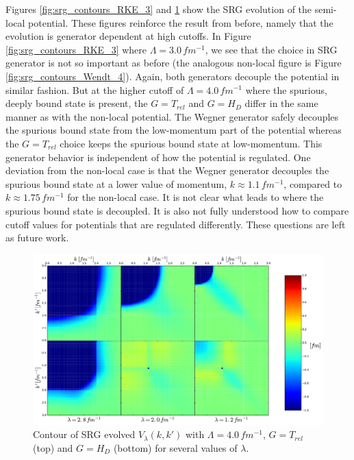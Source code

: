 \documentclass[preprintnumbers,floatfix,aps,prc,preprint]{revtex4-1}
\begin{document}
%
Figures \ref{fig:srg_contours_RKE_3} and \ref{fig:srg_contours_RKE_4} show the SRG evolution of the semi-local potential. These figures reinforce the result from before, namely that the evolution is generator dependent at high cutoffs. In Figure \ref{fig:srg_contours_RKE_3} where $\Lambda=3.0 \, fm^{-1}$, we see that the choice in SRG generator is not so important as before (the analogous non-local figure is Figure \ref{fig:srg_contours_Wendt_4}). Again, both generators decouple the potential in similar fashion. But at the higher cutoff of $\Lambda=4.0 \, fm^{-1}$ where the spurious, deeply bound state is present, the $G=T_{rel}$ and $G=H_D$ differ in the same manner as with the non-local potential. The Wegner generator safely decouples the spurious bound state from the low-momentum part of the potential whereas the $G=T_{rel}$ choice keeps the spurious bound state at low-momentum. This generator behavior is independent of how the potential is regulated. One deviation from the non-local case is that the Wegner generator decouples the spurious bound state at a lower value of momentum, $k \approx 1.1 \, fm^{-1}$, compared to $k \approx 1.75 \, fm^{-1}$ for the non-local case. It is not clear what leads to where the spurious bound state is decoupled. It is also not fully understood how to compare cutoff values for potentials that are regulated differently. These questions are left as future work.
%
\begin{figure}[H]
  \centering
  \includegraphics[width=14cm]{srg_contours_RKE_4}
   \hspace*{0.05\textwidth}%
  \caption{Contour of SRG evolved $V_{\lambda}(k,k')$ with $\Lambda=4.0\,fm^{-1}$, $G=T_{rel}$ (top) and $G=H_{D}$ (bottom) for several values of $\lambda$.}
  \label{fig:srg_contours_RKE_4}
\end{figure}
\end{document}
